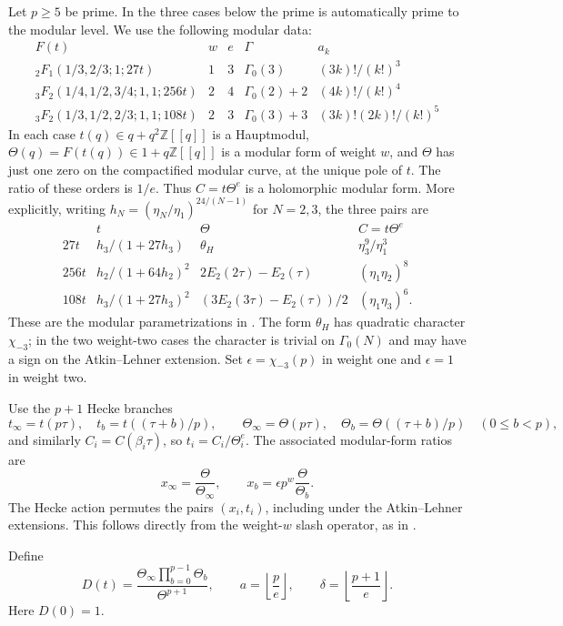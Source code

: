 \documentclass[11pt,a4paper]{article}
\theoremstyle{definition}\newtheorem{definition}[theorem]{Definition}
\theoremstyle{remark}\newtheorem{remark}[theorem]{Remark}
\numberwithin{equation}{section}
\begin{document}
Let $p\geq5$ be prime.  In the three cases below the prime is automatically
prime to the modular level.  We use the following modular data:
\[
\begin{array}{c|c|c|c|c}
 F(t)&w&e&\Gamma&a_k\\ \hline
 {}_2F_1(1/3,2/3;1;27t)&1&3&\Gamma_0(3)&(3k)!/(k!)^3\\
 {}_3F_2(1/4,1/2,3/4;1,1;256t)&2&4&\Gamma_0(2)+2&(4k)!/(k!)^4\\
 {}_3F_2(1/3,1/2,2/3;1,1;108t)&2&3&\Gamma_0(3)+3&(3k)!(2k)!/(k!)^5
\end{array}
\]
In each case $t(q)\in q+q^2\mathbb Z[[q]]$ is a Hauptmodul,
$\Theta(q)=F(t(q))\in1+q\mathbb Z[[q]]$ is a modular form of weight $w$,
and $\Theta$ has just one zero on the compactified modular curve, at the
unique pole of $t$.  The ratio of these orders is $1/e$.  Thus
$C=t\Theta^e$ is a holomorphic modular form.  More explicitly, writing
$h_N=(\eta_N/\eta_1)^{24/(N-1)}$ for $N=2,3$, the three pairs are
\[
\begin{array}{c|c|c|c}
 &t&\Theta&C=t\Theta^e\\ \hline
27t&h_3/(1+27h_3)&\theta_H&\eta_3^9/\eta_1^3\\
256t&h_2/(1+64h_2)^2&2E_2(2\tau)-E_2(\tau)&(\eta_1\eta_2)^8\\
108t&h_3/(1+27h_3)^2&(3E_2(3\tau)-E_2(\tau))/2&(\eta_1\eta_3)^6.
\end{array}
\]
These are the modular parametrizations in
\cite[Appendices B and C]{Beu26}.
The form $\theta_H$ has quadratic character $\chi_{-3}$;
in the two weight-two cases the character is trivial on $\Gamma_0(N)$
and may have a sign on the Atkin--Lehner extension.
Set $\epsilon=\chi_{-3}(p)$ in weight one and $\epsilon=1$ in weight two.

Use the $p+1$ Hecke branches
\[
 t_\infty=t(p\tau),\quad t_b=t((\tau+b)/p),\qquad
 \Theta_\infty=\Theta(p\tau),\quad
 \Theta_b=\Theta((\tau+b)/p)\quad(0\leq b<p),
\]
and similarly $C_i=C(\beta_i\tau)$, so $t_i=C_i/\Theta_i^e$.
The associated modular-form ratios are
\[
 x_\infty=\frac{\Theta}{\Theta_\infty},\qquad
 x_b=\epsilon p^w\frac{\Theta}{\Theta_b}.
\]
The Hecke action permutes the pairs $(x_i,t_i)$, including under the
Atkin--Lehner extensions.  This follows directly from the weight-$w$
slash operator, as in \cite[Lemmas 3.6 and 3.7]{Beu26}.

Define
\[
 D(t)=\frac{\Theta_\infty\prod_{b=0}^{p-1}\Theta_b}{\Theta^{p+1}},
 \qquad a=\left\lfloor\frac pe\right\rfloor,
 \qquad \delta=\left\lfloor\frac{p+1}e\right\rfloor.
\]
Here $D(0)=1$.
\end{document}
